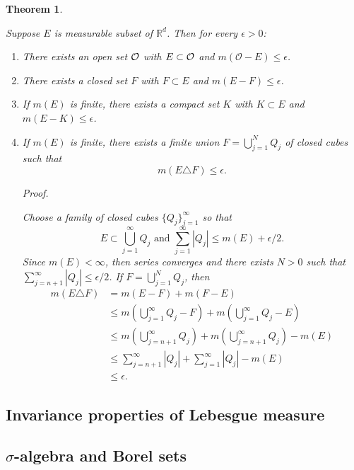 \documentclass[
]{book}
\providecommand{\tightlist}{%
  \setlength{\itemsep}{0pt}\setlength{\parskip}{0pt}}
\newtheorem{theorem}{Theorem}[chapter]
\theoremstyle{definition}
\theoremstyle{definition}
\theoremstyle{definition}
\theoremstyle{definition}
\theoremstyle{remark}
\begin{document}
\begin{theorem}
\protect\hypertarget{thm:m}{}\label{thm:m}

Suppose \(E\) is measurable subset of \(\mathbb{R}^d\). Then for every \(\epsilon>0\):

\begin{enumerate}
\def\labelenumi{\arabic{enumi}.}
\tightlist
\item
  There exists an open set \(\cal O\) with \(E\subset \cal O\) and \(m(\mathcal{O}-E)\leq\epsilon\).
\item
  There exists a closed set \(F\) with \(F\subset E\) and \(m(E-F)\leq\epsilon\).
\item
  If \(m(E)\) is finite, there exists a compact set \(K\) with \(K\subset E\) and \(m(E-K)\leq \epsilon\).
\item
  If \(m(E)\) is finite, there exists a finite union \(F=\bigcup_{j=1}^NQ_j\) of closed cubes such that
  \[
  m(E\triangle F)\leq \epsilon.
  \]

  \emph{Proof.}

  Choose a family of closed cubes \(\{Q_j\}_{j=1}^{\infty}\) so that
  \[
    E\subset \bigcup_{j=1}^{\infty}Q_j \text{ and } \sum_{j=1}^{\infty}|Q_j|\le m(E) +\epsilon/2.
    \]
  Since \(m(E) <\infty\), then series converges and there exists \(N>0\) such that \(\sum_{j=n+1}^{\infty}|Q_j|\le \epsilon/2\). If \(F=\bigcup_{j=1}^NQ_j\), then
  \[
   \begin{aligned}
   m(E\triangle F) &= m(E-F)+m(F-E)\\
   &\le m\left( \bigcup_{j=1}^{\infty}Q_j - F\right)+m\left( \bigcup_{j=1}^{\infty}Q_j-E\right)\\
   &\le m\left( \bigcup_{j=n+1}^{\infty}Q_j\right)+ m\left( \bigcup_{j=n+1}^{\infty}Q_j\right)-m(E)\\
   &\le \sum_{j=n+1}^{\infty}|Q_j|+\sum_{j=1}^{\infty}|Q_j|-m(E)\\
   &\le \epsilon.
   \end{aligned}
   \]
\end{enumerate}

\end{theorem}

\subsection{Invariance properties of Lebesgue measure}\label{invariance-properties-of-lebesgue-measure}

\subsection{\texorpdfstring{\(\sigma\)-algebra and Borel sets}{\textbackslash sigma-algebra and Borel sets}}\label{sigma-algebra-and-borel-sets}
\end{document}
